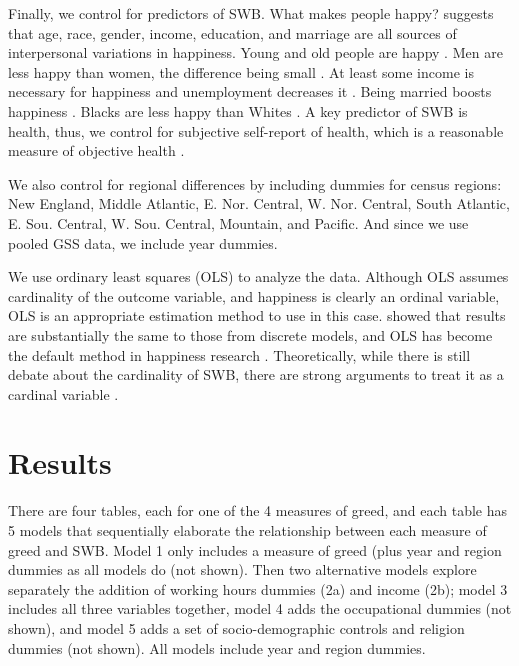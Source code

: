 \documentclass[10pt, letterpaper]{article}
\begin{document}
\begin{spacing}{1.8}
Finally, we control for predictors of SWB. What makes people happy?
\citet{myers00} suggests that age, race, gender, income, education, and marriage are all sources of interpersonal variations in happiness. Young and old people
are happy  \citep[e.g.,][]{teksoz}. Men are less happy than women, the difference being small \citep{blanchflower04o}. At least some income is necessary for happiness and unemployment decreases it
    \citep[e.g.,][]{ditella01moa,ditella01mob,ditella06m}. Being married boosts happiness \citep[e.g.,][]{myers00,diener04s}.
     Blacks are less happy than Whites
    \citep[e.g.,][]{aokcities,aok11a,blanchflower04o}.   
     A key predictor of SWB is health, thus, we control for subjective self-report of health, which is a reasonable measure of objective health \citep{subramanian09b}.

We also control for regional  differences by including dummies for census regions:  New England, Middle Atlantic, E. Nor. Central, W. Nor. Central, South
Atlantic, E. Sou. Central, W. Sou. Central, Mountain, and Pacific. And since we use pooled GSS data, we include year dummies.

We use ordinary least squares (OLS) to analyze the data. Although OLS assumes cardinality of the outcome variable, and happiness is clearly an ordinal variable, 
OLS is an appropriate estimation method to use in this case. \citet{carbonell04} showed that results are substantially the same to those from discrete models, 
and OLS has become the default method in happiness research \citep{blanchflower11}.
Theoretically, while there is still debate about the cardinality of SWB, there are strong arguments to treat it as a cardinal variable \citep{ng96,ng97,ng11}. 


\section{Results}

There are four tables, each for one of the 4  measures of
greed, and each table has 5 models that sequentially elaborate the relationship between each measure of greed and SWB. Model 1 only includes a measure of greed (plus year and region dummies as all models do (not shown). Then  two
alternative models  explore separately the addition of working hours dummies (2a)
and income (2b); model 3 includes all three variables together, model 4 adds the occupational dummies (not shown), and model 5 adds a set of socio-demographic
controls and religion dummies (not shown). All models include year and region dummies.
 

\end{spacing}
\end{document}
